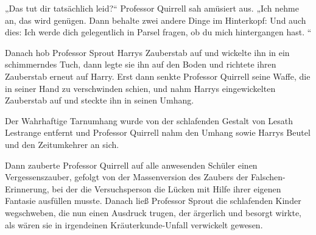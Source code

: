 „Das tut dir tatsächlich leid?“
Professor Quirrell sah amüsiert aus.
„Ich nehme an, das wird genügen. Dann behalte zwei andere Dinge im Hinterkopf:  Und auch dies: Ich werde dich gelegentlich in Parsel fragen, ob du mich hintergangen hast. “

\later

Danach hob Professor Sprout Harrys Zauberstab auf und wickelte ihn in ein schimmerndes Tuch, dann legte sie ihn auf den Boden und richtete ihren Zauberstab erneut auf Harry. Erst dann senkte Professor Quirrell seine Waffe, die in seiner Hand zu verschwinden schien, und nahm Harrys eingewickelten Zauberstab auf und steckte ihn in seinen Umhang.

Der Wahrhaftige Tarnumhang wurde von der schlafenden Gestalt von Lesath Lestrange entfernt und Professor Quirrell nahm den Umhang sowie Harrys Beutel und den Zeitumkehrer an sich.

Dann zauberte Professor Quirrell auf alle anwesenden Schüler einen Vergessenszauber, gefolgt von der Massenversion des Zaubers der Falschen-Erinnerung, bei der die Versuchsperson die Lücken mit Hilfe ihrer eigenen Fantasie ausfüllen musste. Danach ließ Professor Sprout die schlafenden Kinder wegschweben, die nun einen Ausdruck trugen, der ärgerlich und besorgt wirkte, als wären sie in irgendeinen Kräuterkunde-Unfall verwickelt gewesen.

